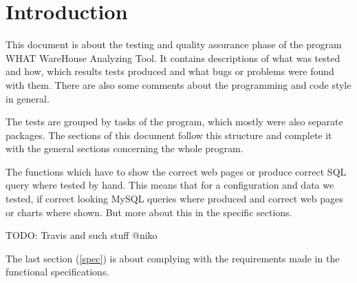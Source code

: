 \section{Introduction}

This document is about the testing and quality assurance phase of the program WHAT WareHouse Analyzing Tool.
It contains descriptions of what was tested and how, which results tests produced and 
what bugs or problems were found with them.
There are also some comments about the programming and code style in general. 

The tests are grouped by tasks of the program, which mostly were also separate packages. 
The sections of this document follow this structure and complete it with the 
general sections concerning the whole program.

The functions which have to show the correct web pages or produce correct SQL query where tested by hand. 
This means that for a configuration and data we tested, 
if correct looking MySQL queries where produced and correct web pages or charts where shown. 
But more about this in the specific sections.

TODO: Travis and such stuff @niko

The last section (\ref{spec}) is about complying with the requirements made in the functional specifications.




 